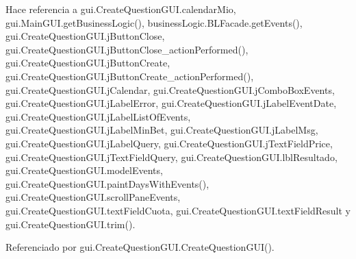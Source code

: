 \begin{DoxyCode}{0}

\end{DoxyCode}


Hace referencia a gui.\+Create\+Question\+G\+U\+I.\+calendar\+Mio, gui.\+Main\+G\+U\+I.\+get\+Business\+Logic(), business\+Logic.\+B\+L\+Facade.\+get\+Events(), gui.\+Create\+Question\+G\+U\+I.\+j\+Button\+Close, gui.\+Create\+Question\+G\+U\+I.\+j\+Button\+Close\+\_\+action\+Performed(), gui.\+Create\+Question\+G\+U\+I.\+j\+Button\+Create, gui.\+Create\+Question\+G\+U\+I.\+j\+Button\+Create\+\_\+action\+Performed(), gui.\+Create\+Question\+G\+U\+I.\+j\+Calendar, gui.\+Create\+Question\+G\+U\+I.\+j\+Combo\+Box\+Events, gui.\+Create\+Question\+G\+U\+I.\+j\+Label\+Error, gui.\+Create\+Question\+G\+U\+I.\+j\+Label\+Event\+Date, gui.\+Create\+Question\+G\+U\+I.\+j\+Label\+List\+Of\+Events, gui.\+Create\+Question\+G\+U\+I.\+j\+Label\+Min\+Bet, gui.\+Create\+Question\+G\+U\+I.\+j\+Label\+Msg, gui.\+Create\+Question\+G\+U\+I.\+j\+Label\+Query, gui.\+Create\+Question\+G\+U\+I.\+j\+Text\+Field\+Price, gui.\+Create\+Question\+G\+U\+I.\+j\+Text\+Field\+Query, gui.\+Create\+Question\+G\+U\+I.\+lbl\+Resultado, gui.\+Create\+Question\+G\+U\+I.\+model\+Events, gui.\+Create\+Question\+G\+U\+I.\+paint\+Days\+With\+Events(), gui.\+Create\+Question\+G\+U\+I.\+scroll\+Pane\+Events, gui.\+Create\+Question\+G\+U\+I.\+text\+Field\+Cuota, gui.\+Create\+Question\+G\+U\+I.\+text\+Field\+Result y gui.\+Create\+Question\+G\+U\+I.\+trim().



Referenciado por gui.\+Create\+Question\+G\+U\+I.\+Create\+Question\+G\+U\+I().

\mbox{\label{classgui_1_1CreateQuestionGUI_a9abbdb8a214e4c578ea5858fc1f52fc1}} 
